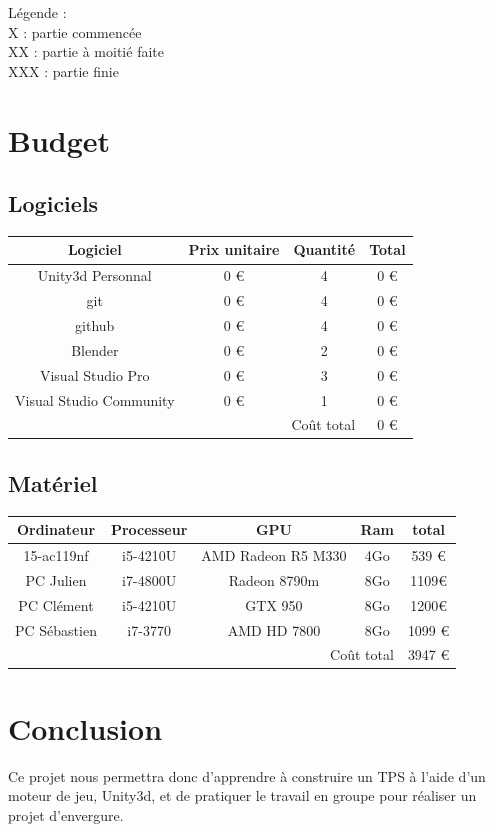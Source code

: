 ﻿\documentclass{article}
\begin{document}
Légende :\\
X : partie commencée\\
XX : partie à moitié faite\\
XXX : partie finie

\section{Budget}
\subsection{Logiciels}

\begin{tabular}{|c|c|c|c|}
\hline
Logiciel					&	Prix unitaire	&	Quantité	&	Total	\\ \hline
Unity3d Personnal			&	0 \euro			&	4			&	0 \euro	\\ \hline
git							&	0 \euro			&	4			&	0 \euro	\\ \hline
github						&	0 \euro			&	4			&	0 \euro	\\ \hline
Blender						&	0 \euro			&	2			&	0 \euro	\\ \hline
Visual Studio Pro			&	0 \euro			&	3			&	0 \euro	\\ \hline
Visual Studio Community		&	0 \euro			&	1			&	0 \euro	\\ \hline
\multicolumn{3}{|r|}{Coût total}									&	0 \euro	\\ \hline
\end{tabular}

\subsection{Matériel}
\begin{tabular}{|c|c|c|c|c|}
\hline
Ordinateur		&	Processeur	&	GPU					&	Ram	&	total		\\ \hline
15-ac119nf		&	i5-4210U	&	AMD Radeon R5 M330	&	4Go &	539 \euro	\\ \hline
PC Julien		&	i7-4800U			&	Radeon 8790m					&	8Go	&	1109\euro		\\ \hline
PC Clément		&	i5-4210U			&	GTX 950					&	8Go	&	1200\euro		\\ \hline
PC Sébastien	&		i7-3770		&		AMD HD 7800				& 	8Go	& 1099	\euro		\\ \hline
\multicolumn{4}{|r|}{Coût total}								&	3947 \euro	\\ \hline
\end{tabular}

\section{Conclusion}
Ce projet nous permettra donc d'apprendre à construire un TPS à l'aide d'un moteur
de jeu, Unity3d, et de pratiquer le travail en groupe pour réaliser un projet d'envergure.
\end{document}
